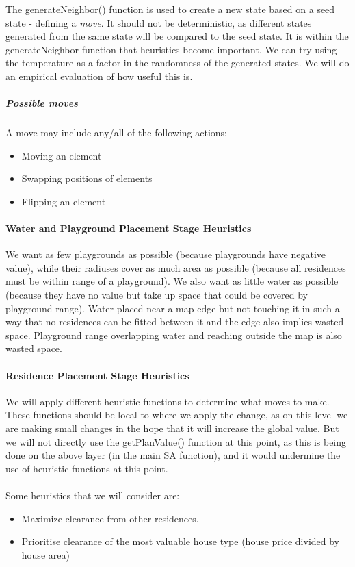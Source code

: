 \documentclass{article}
\begin{document}
The generateNeighbor() function is used to create a new state based on a seed state - defining a \textit{move}. It should not be deterministic, as different states generated from the same state will be compared to the seed state. It is within the generateNeighbor function that heuristics become important. We can try using the temperature as a factor in the randomness of the generated states. We will do an empirical evaluation of how useful this is.

\subparagraph{Possible moves}

A move may include any/all of the following actions:
\begin{itemize}
    \item Moving an element
    \item Swapping positions of elements
    \item Flipping an element
\end{itemize}


\paragraph{Water and Playground Placement Stage Heuristics}

We want as few playgrounds as possible (because playgrounds have negative value), while their radiuses cover as much area as possible (because all residences must be within range of a playground). We also want as little water as possible (because they have no value but take up space that could be covered by playground range). Water placed near a map edge but not touching it in such a way that no residences can be fitted between it and the edge also implies wasted space. Playground range overlapping water and reaching outside the map is also wasted space.

\paragraph{Residence Placement Stage Heuristics}

We will apply different heuristic functions to determine what moves to make. These functions should be local to where we apply the change, as on this level we are making small changes in the hope that it will increase the global value. But we will not directly use the getPlanValue() function at this point, as this is being done on the above layer (in the main SA function), and it would undermine the use of heuristic functions at this point.
\\
\\
Some heuristics that we will consider are:
\begin{itemize}
 \item Maximize clearance from other residences.
 \item Prioritise clearance of the most valuable house type (house price divided by house area)
\end{itemize}
\end{document}
